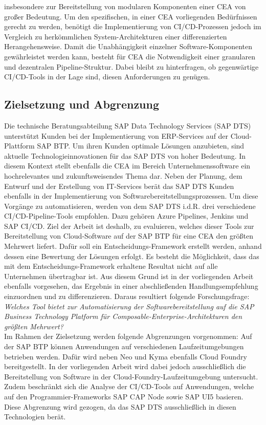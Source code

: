 insbesondere zur Bereitstellung von modularen Komponenten einer CEA von großer Bedeutung. Um den spezifischen, in einer CEA vorliegenden Bedürfnissen gerecht zu werden, benötigt die Implementierung von CI/CD-Prozessen jedoch im Vergleich zu herkömmlichen System-Architekturen einer differenzierten Herangehensweise. Damit die Unabhängigkeit einzelner Software-Komponenten gewährleistet werden kann, besteht für CEA die Notwendigkeit einer granularen und dezentralen Pipeline-Struktur. Dabei bleibt zu hinterfragen, ob gegenwärtige CI/CD-Tools in der Lage sind, diesen Anforderungen zu genügen.


\subsection{Zielsetzung und Abgrenzung}
Die technische Beratungsabteilung SAP Data Technology Services (\acs{SAP DTS}) unterstützt Kunden bei der Implementierung von ERP-Services auf der Cloud-Plattform \ac{SAP BTP}. Um ihren Kunden optimale Lösun\-gen anzubieten, sind aktuelle Technologieinnovationen für das SAP DTS von hoher Bedeutung. In diesem Kontext stellt ebenfalls die CEA im Bereich Unternehmenssoftware ein hochrelevantes und zukunftsweisendes Thema dar. Neben der Planung, dem Entwurf und der Erstellung von IT-Services berät das SAP DTS Kunden ebenfalls in der Implementierung von Softwarebereitstellungsprozessen. Um diese Vorgänge zu automatisieren, werden von dem SAP DTS i.d.R. drei verschiedene CI/CD-Pipeline-Tools empfohlen. Dazu gehören Azure Pipelines, Jenkins und \acs{SAP CI/CD}. Ziel der Arbeit ist deshalb, zu evaluieren, welches dieser Tools zur Bereitstellung von Cloud-Software auf der SAP BTP für eine CEA den größten Mehrwert liefert. Dafür soll ein Entscheidungs-Framework erstellt werden, anhand dessen eine Bewertung der Lösungen erfolgt. Es besteht die Möglichkeit, dass das mit dem Entscheidungs-Framework erhaltene Resultat nicht auf alle Unternehmen übertragbar ist. Aus diesem Grund ist in der vorliegenden Arbeit ebenfalls vorgesehen, das Ergebnis in einer abschließenden Handlungsempfehlung einzuordnen und zu differenzieren. Daraus resultiert folgende Forschungsfrage:\\
\textit{Welches Tool bietet zur Automatisierung der Softwarebereitstellung auf die SAP Business Technology Platform für Composable-\-Enterprise-Architekturen den größten Mehrwert?}\\
Im Rahmen der Zielsetzung werden folgende Abgrenzungen vorgenommen: Auf der SAP BTP können Anwendungen auf verschiedenen Laufzeitumgebungen betrieben werden. Dafür wird neben Neo und Kyma ebenfalls Cloud Foundry bereitgestellt. In der vorliegenden Arbeit wird dabei jedoch ausschließlich die Bereitstellung von Software in der Cloud-Foundry-Laufzeitumgebung untersucht. Zudem beschränkt sich die Analyse der CI/CD-Tools auf Anwendungen, welche auf den Programmier-Frameworks SAP CAP Node sowie SAP UI5 basieren. Diese Abgrenzung wird gezogen, da das SAP DTS ausschließlich in diesen Technologien berät.  

